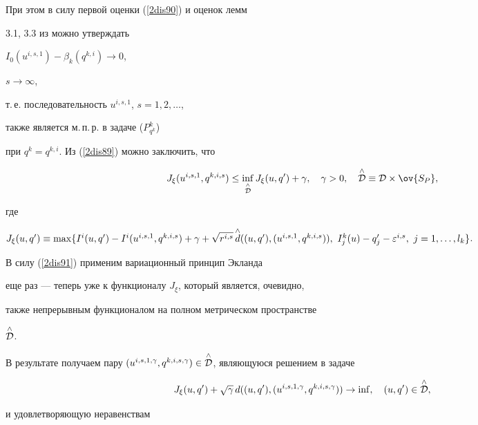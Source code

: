 При этом в силу первой оценки (\ref{2dis90}) и оценок лемм


3.1, 3.3 из \cite{sumin98} можно утверждать


$I_0(u^{i,s,1})-\beta_k(q^{k,i})\to 0$,


$s\to\infty$,


т.\,е. последовательность $u^{i,s,1}$, $s=1,2,\dotsc$,


также является м.\,п.\,р. в задаче ($P^k_{q^k}$)


при $q^k=q^{k,i}$. Из (\ref{2dis89}) можно заключить, что


\begin{equation}\label{2dis91}


J_\xi(u^{i,s,1},q^{k,i,s})\leq\inf_{\up{\wedge}{\cal D}}


J_\xi(u,q')+\gamma, \quad\gamma>0,\quad\up{\wedge}{\cal D}\equiv


{\cal D}\times\ov{S_P},


\end{equation}


где


$J_\xi(u,q')\equiv\max\{I^i(u,q')-I^i(u^{i,s,1},q^{k,i,s})+


\gamma+\sqrt{r^{i,s}}\,\up{\wedge}{d}((u,q'),(u^{i,s,1},q^{k,i,s})),


\ I^k_j(u)-q_j'-\varepsilon^{i,s},\ j=1,\dotsc,l_k\}$.


В силу (\ref{2dis91}) применим вариационный принцип Экланда


еще раз --- теперь уже к функционалу $J_\xi$, который является, очевидно,


также непрерывным функционалом на полном метрическом пространстве


$\overset{\wedge}{\cal D}{}$.


В результате получаем пару $(u^{i,s,1,\gamma},q^{k,i,s,\gamma})\in


\up{\wedge}{\cal D}$, являющуюся решением в задаче


$$




J_\xi(u,q')+\sqrt\gamma\,{d}((u,q'),(u^{i,s,1,\gamma},


q^{k,i,s,\gamma}))\to\inf,\quad (u,q')\in\up{\wedge}{\cal D},




$$


и удовлетворяющую неравенствам



